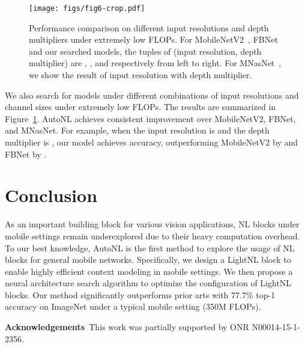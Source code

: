 \documentclass[10pt,twocolumn,letterpaper]{article}
\begin{document}
\begin{figure}[t]
\centering
\texttt{[image: figs/fig6-crop.pdf]}
\caption{Performance comparison on different input resolutions and depth multipliers under extremely low FLOPs. For MobileNetV2~\cite{sandler2018mobilenetv2}, FBNet~\cite{wu2019fbnet} and our searched models, the tuples of (input resolution, depth multiplier) are , ,  and  respectively from left to right. For MNasNet~\cite{tan2019mnasnet}, we show the result of  input resolution with  depth multiplier.} 
\label{fig:fbnet}
\vspace{-1.5em}
\end{figure}

We also search for models under different combinations of input resolutions and channel sizes under extremely low FLOPs. The results are summarized in Figure~\ref{fig:fbnet}. AutoNL achieves consistent improvement over MobileNetV2, FBNet, and MNasNet. For example, when the input resolution is  and the depth multiplier is , our model achieves  accuracy, outperforming MobileNetV2 by  and FBNet by .

\section{Conclusion}
As an important building block for various vision applications, NL blocks under mobile settings remain underexplored due to their heavy computation overhead.
To our best knowledge, AutoNL is the first method to explore the usage of NL blocks for general mobile networks. 
Specifically, we design a LightNL block to enable highly efficient context modeling in mobile settings. We then propose a neural architecture search algorithm to optimize the configuration of LightNL blocks. Our method significantly outperforms prior arts with 77.7\% top-1 accuracy on ImageNet under a typical mobile setting (350M FLOPs).

\small{\vspace{1ex}\noindent\textbf{Acknowledgements}~This work was partially supported by ONR N00014-15-1-2356.}

{\small


}
\end{document}
